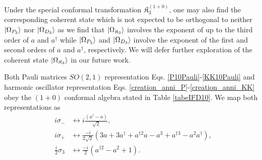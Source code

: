\documentclass[%
 reprint,
superscriptaddress,
 amsmath,amssymb,
 aps,
]{revtex4-2}
\begin{document}
Under the special conformal transformation $\mathfrak{K}^{(1+0)}_{{3}}$, one may also find the corresponding coherent state which is not expected to be orthogonal to neither $\ket{\Omega_{P_{3}}}$ nor $\ket{\Omega_{D_{3}}}$ as we find that $\ket{\Omega_{\mathfrak{K}_{3}}}$ involves the exponent of up to the third order of $a$ and $a^\dagger$ while $\ket{\Omega_{P_{3}}}$ and $\ket{\Omega_{D_{3}}}$ involve the exponent of the first and second orders of $a$ and $a^\dagger$, respectively. 
We will defer further exploration of the coherent state $\ket{\Omega_{\mathfrak{K}_{3}}}$ in 
our future work.

{\color{red} Both Pauli matrices $SO(2,1)$ representation Eqs. \eqref{P10Pauli}-\eqref{KK10Pauli} and harmonic oscillator representation Eqs. \eqref{creation_anni_P}-\eqref{creation_anni_KK} obey the $(1+0)$ conformal algebra stated in Table \ref{tabeIFD10}. We map both representations as
\begin{align}
    i\sigma_{-}&\leftrightarrow i\frac{(a^{\dagger}-a)}{\sqrt{2}},\\
    i\sigma_{+}&\leftrightarrow \frac{-i}{2\sqrt{2}}\left(3a+3a^{\dagger}+  a^{\dagger 2}a - a^3 +  a^{\dagger 3} - a^2 a^{\dagger}\right),\\
    \frac{i}{2}\sigma_{3}&\leftrightarrow \frac{-i}{2}\left(a^{\dagger 2} - a^2+1\right).
\end{align} 
}
\end{document}
